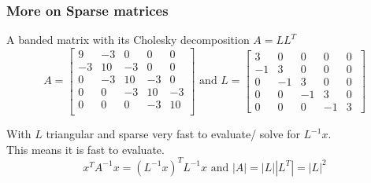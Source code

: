 \documentclass[english]{beamer} %
\begin{document}
\begin{frame} %
\frametitle{More on Sparse matrices}
 A banded matrix with its Cholesky decomposition   $A= LL^T$
 {\small
 \[   A= \left[
     \begin{array}{rrrrr}
      9 & -3 & 0& 0&0 \\
       -3 &10&  -3& 0&0 \\
       0&-3 &10&  -3& 0\\
        0&0&-3 &10&  -3\\
         0& 0&0&-3 &10\\
         \end{array}
         \right]
         \mbox{ and }
          L= \left[
           \begin{array}{rrrrr}
      3 & 0 & 0& 0&0 \\
       -1 &3& 0& 0&0 \\
       0&-1 &3& 0& 0\\
        0&0&-1 &3& 0\\
         0& 0&0&-1 &3\
         \end{array}
          \right]  
     \]  
     } %
     
     
\bdot With $L$ triangular and sparse very fast to  evaluate/ solve for  $L^{-1} x$. \\

This means it is fast to evaluate. 
\[ x^TA^{-1}x  = (L^{-1}x )^T L^{-1} x  \mbox{ and }  |A| = |L | |L^T| =  |L|^2 \] 

     
\end{frame}
 
\end{document}
